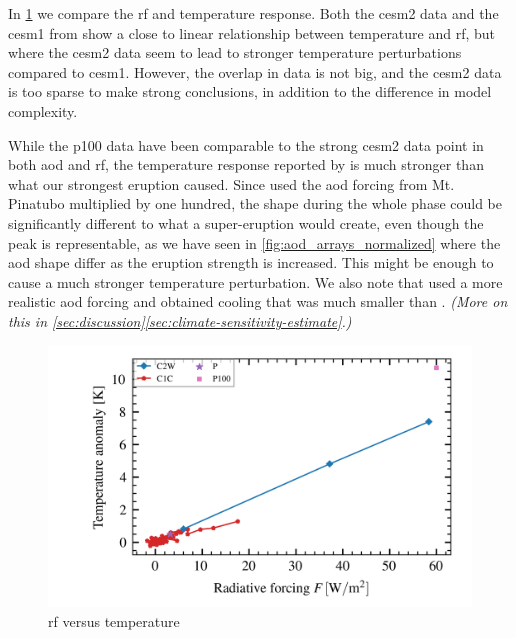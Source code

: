 \documentclass{ametsocV5}
\begin{document}
In \cref{fig:toa_vs_temp} we compare the \acrshort{rf} and temperature response. Both
the \acrshort{cesm2} data and the \acrshort{cesm1} from \citet{ottobliesner2016} show a
close to linear relationship between temperature and \acrshort{rf}, but where the
\acrshort{cesm2} data seem to lead to stronger temperature perturbations compared to
\acrshort{cesm1}. However, the overlap in data is not big, and the \acrshort{cesm2} data
is too sparse to make strong conclusions, in addition to the difference in model
complexity.

While the \acrshort{p100} data have been comparable to the strong \acrshort{cesm2} data
point in both \acrshort{aod} and \acrshort{rf}, the temperature response reported by
\citet{jones2005} is much stronger than what our strongest eruption caused. Since
\citet{jones2005} used the \acrshort{aod} forcing from Mt. Pinatubo multiplied by one
hundred, the shape during the whole phase could be significantly different to what a
super-eruption would create, even though the peak is representable, as we have seen in
\cref{fig:aod_arrays_normalized} where the \acrshort{aod} shape differ as the eruption
strength is increased. This might be enough to cause a much stronger temperature
perturbation. We also note that \citet{timmreck2010} used a more realistic
\acrshort{aod} forcing and obtained cooling that was much smaller than
\citet{jones2005}. \emph{(More on this in
  \cref{sec:discussion}\ref{sec:climate-sensitivity-estimate}.)}

\begin{figure}[t]
  \begin{center}
    \includegraphics[width=0.95\linewidth]{figures/toa_vs_temperature.png}
  \end{center}
  \caption{\acrshort{rf} versus temperature}%
  \label{fig:toa_vs_temp}
\end{figure}
\end{document}
